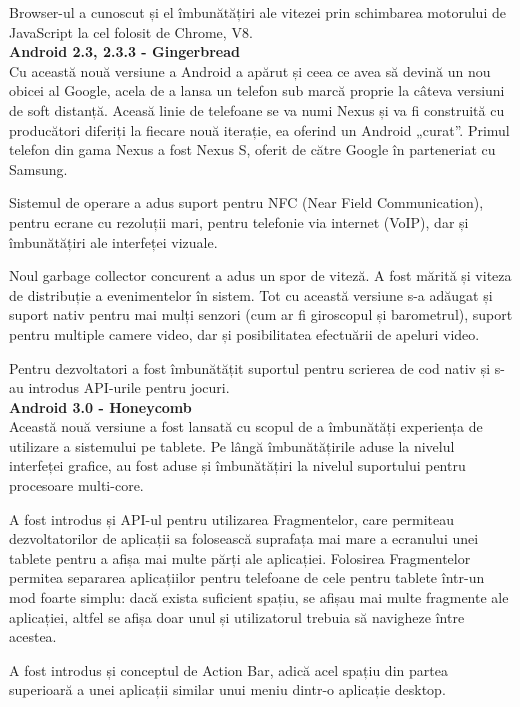 \documentclass[12pt,a4paper]{article}
\begin{document}
	Browser-ul a cunoscut și el îmbunătățiri ale vitezei prin schimbarea motorului de JavaScript la cel folosit de Chrome, V8.\\

\textbf{Android 2.3, 2.3.3 - Gingerbread}\\
Cu această nouă versiune a Android a apărut și ceea ce avea să devină un nou obicei al Google, acela de a lansa un telefon sub marcă proprie la câteva versiuni de soft distanță. Aceasă linie de telefoane se va numi Nexus și va fi construită cu producători diferiți la fiecare nouă iterație, ea oferind un Android „curat”. Primul telefon din gama Nexus a fost Nexus S, oferit de către Google în parteneriat cu Samsung.

	Sistemul de operare a adus suport pentru NFC (Near Field Communication), pentru ecrane cu rezoluții mari, pentru telefonie via internet (VoIP), dar și îmbunătățiri ale interfeței vizuale.

	Noul garbage collector concurent a adus un spor de viteză. A fost mărită și viteza de distribuție a evenimentelor în sistem. Tot cu această versiune s-a adăugat și suport nativ pentru mai mulți senzori (cum ar fi giroscopul și barometrul), suport pentru multiple camere video, dar și posibilitatea efectuării de apeluri video.

	Pentru dezvoltatori a fost îmbunătățit suportul pentru scrierea de cod nativ și s-au introdus API-urile pentru jocuri.\\

\textbf{Android 3.0 - Honeycomb}\\
Această nouă versiune a fost lansată cu scopul de a îmbunătăți experiența de utilizare a sistemului pe tablete. Pe lângă îmbunătățirile aduse la nivelul interfeței grafice, au fost aduse și îmbunătățiri la nivelul suportului pentru procesoare multi-core.

	A fost introdus și API-ul pentru utilizarea Fragmentelor, care permiteau dezvoltatorilor de aplicații sa folosească suprafața mai mare a ecranului unei tablete pentru a afișa mai multe părți ale aplicației. Folosirea Fragmentelor permitea separarea aplicațiilor pentru telefoane de cele pentru tablete într-un mod foarte simplu: dacă exista suficient spațiu, se afișau mai multe fragmente ale aplicației, altfel se afișa doar unul și utilizatorul trebuia să navigheze între acestea.

	A fost introdus și conceptul de Action Bar, adică acel spațiu din partea superioară a unei aplicații similar unui meniu dintr-o aplicație desktop.\\
\end{document}
